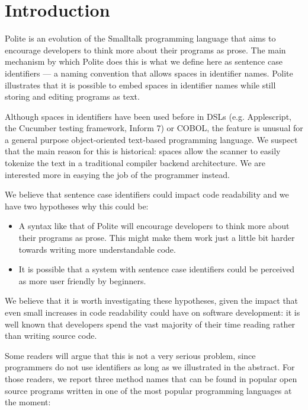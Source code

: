 

\section{Introduction}

Polite is an evolution of the Smalltalk programming language that aims to encourage developers to think more about their programs as prose. The main mechanism by which Polite does this is what we define here as sentence case identifiers --- a naming convention that allows spaces in identifier names. Polite illustrates that it is possible to embed spaces in identifier names while still storing and editing programs as text. 

Although spaces in identifiers have been used before in DSLs (e.g. Applescript, the Cucumber testing framework, Inform 7) or COBOL, the feature is unusual for a general purpose object-oriented text-based programming language. We suspect that the main reason for this is historical: spaces allow the scanner to easily tokenize the text in a traditional compiler backend architecture. We are interested more in easying the job of the programmer instead.


We believe that sentence case identifiers could impact code readability and we have two hypotheses why this could be: 

\begin{itemize}

	\item A syntax like that of Polite will encourage developers to think more about their programs as prose. This might make them work just a little bit harder towards writing more understandable code. 

	\item It is possible that a system with sentence case identifiers could be perceived as more user friendly by beginners.

\end{itemize}

We believe that it is worth investigating these hypotheses, given the impact that even small increases in code readability could have on software development: it is well known that developers spend the vast majority of their time reading rather than writing source code.


Some readers will argue that this is not a very serious problem, since programmers do not use identifiers as long as we illustrated in the abstract. For those readers, we report three method names that can be found in popular open source programs written in one of the most popular programming languages at the moment: 


